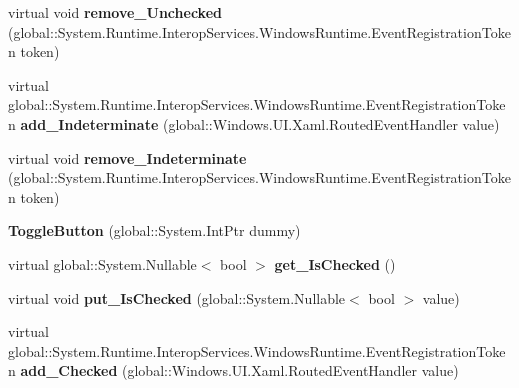 \begin{DoxyCompactItemize}
virtual void {\bfseries remove\+\_\+\+Unchecked} (global\+::\+System.\+Runtime.\+Interop\+Services.\+Windows\+Runtime.\+Event\+Registration\+Token token)
\item 
\mbox{\label{class_windows_1_1_u_i_1_1_xaml_1_1_controls_1_1_primitives_1_1_toggle_button_a1f1913eba8709563eba2ffc6ada7b337}} 
virtual global\+::\+System.\+Runtime.\+Interop\+Services.\+Windows\+Runtime.\+Event\+Registration\+Token {\bfseries add\+\_\+\+Indeterminate} (global\+::\+Windows.\+U\+I.\+Xaml.\+Routed\+Event\+Handler value)
\item 
\mbox{\label{class_windows_1_1_u_i_1_1_xaml_1_1_controls_1_1_primitives_1_1_toggle_button_af20454c3f1b1b6b81eb8483851df5397}} 
virtual void {\bfseries remove\+\_\+\+Indeterminate} (global\+::\+System.\+Runtime.\+Interop\+Services.\+Windows\+Runtime.\+Event\+Registration\+Token token)
\item 
\mbox{\label{class_windows_1_1_u_i_1_1_xaml_1_1_controls_1_1_primitives_1_1_toggle_button_a49287addc0d795495badcb684663bfbb}} 
{\bfseries Toggle\+Button} (global\+::\+System.\+Int\+Ptr dummy)
\item 
\mbox{\label{class_windows_1_1_u_i_1_1_xaml_1_1_controls_1_1_primitives_1_1_toggle_button_a202ddd3b271346dd0243b775278794c4}} 
virtual global\+::\+System.\+Nullable$<$ bool $>$ {\bfseries get\+\_\+\+Is\+Checked} ()
\item 
\mbox{\label{class_windows_1_1_u_i_1_1_xaml_1_1_controls_1_1_primitives_1_1_toggle_button_ac698bb4aa4d35725eb48fe2b35f4e0f8}} 
virtual void {\bfseries put\+\_\+\+Is\+Checked} (global\+::\+System.\+Nullable$<$ bool $>$ value)
\item 
\mbox{\label{class_windows_1_1_u_i_1_1_xaml_1_1_controls_1_1_primitives_1_1_toggle_button_a55fb908f07af09c5b2cbf2a26bb63503}} 
virtual global\+::\+System.\+Runtime.\+Interop\+Services.\+Windows\+Runtime.\+Event\+Registration\+Token {\bfseries add\+\_\+\+Checked} (global\+::\+Windows.\+U\+I.\+Xaml.\+Routed\+Event\+Handler value)

\end{DoxyCompactItemize}
